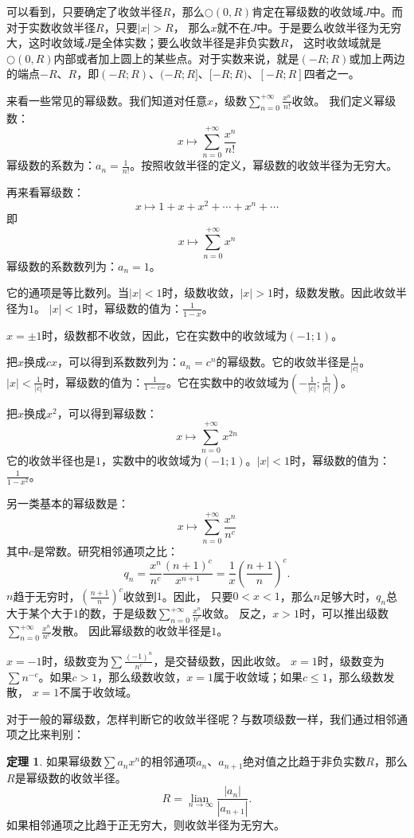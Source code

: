\documentclass[12pt,UTF8]{ctexbook}
\newcommand{\lian}[1]{
    \underset{#1}{\operatorname{lian}\,}
}
\newcommand{\qu}[2]{\displaystyle\left(#1;#2\right)}
\theoremstyle{definition}
\newtheorem{tm}{定理}[section]
\theoremstyle{plain}
\begin{document}
可以看到，只要确定了收敛半径$R$，那么$\bigcirc(0,R)$肯定在幂级数的收敛域$J$中。而对于实数收敛半径$R$，只要$|x|>R$，
那么$x$就不在$J$中。于是要么收敛半径为无穷大，这时收敛域$J$是全体实数；要么收敛半径是非负实数$R$，
这时收敛域就是$\bigcirc(0,R)$内部或者加上圆上的某些点。对于实数来说，就是$(-R;R)$或加上两边的端点$-R$、$R$，即$(-R;R)$、$(-R;R]$、$[-R;R)$、$[-R;R]$四者之一。

来看一些常见的幂级数。我们知道对任意$x$，级数$\sum_{n=0}^{+\infty} \frac{x^n}{n!}$收敛。
我们定义幂级数：
$$ x \mapsto \sum_{n=0}^{+\infty} \frac{x^n}{n!} $$
幂级数的系数为：$a_n = \frac{1}{n!}$。按照收敛半径的定义，幂级数的收敛半径为无穷大。

再来看幂级数：
$$ x \mapsto 1 + x + x^2 + \cdots + x^n + \cdots $$
即
$$ x \mapsto \sum_{n=0}^{+\infty} x^n $$
幂级数的系数数列为：$a_n = 1$。

它的通项是等比数列。当$|x|<1$时，级数收敛，$|x|>1$时，级数发散。因此收敛半径为$1$。
$|x|<1$时，幂级数的值为：$\frac{1}{1 - x}$。

$x = \pm 1$时，级数都不收敛，因此，它在实数中的收敛域为$(-1;1)$。

把$x$换成$cx$，可以得到系数数列为：$a_n = c^n$的幂级数。它的收敛半径是$\frac{1}{|c|}$。
$|x|<\frac{1}{|c|}$时，幂级数的值为：$\frac{1}{1 - cx}$。它在实数中的收敛域为$\qu{-\frac{1}{|c|}}{\frac{1}{|c|}}$。

把$x$换成$x^2$，可以得到幂级数：
$$ x \mapsto \sum_{n=0}^{+\infty} x^{2n} $$
它的收敛半径也是$1$，实数中的收敛域为$(-1;1)$。$|x|<1$时，幂级数的值为：$\frac{1}{1 - x^2}$。

另一类基本的幂级数是：
$$ x \mapsto \sum_{n=0}^{+\infty} \frac{x^n}{n^c}$$
其中$c$是常数。研究相邻通项之比：
$$ q_n = \frac{x^n}{n^c} \frac{(n+1)^c}{x^{n+1}} = \frac{1}{x} \left(\frac{n+1}{n}\right)^c. $$
$n$趋于无穷时，$\displaystyle \left(\frac{n+1}{n}\right)^c$收敛到$1$。因此，
只要$0<x<1$，那么$n$足够大时，$q_n$总大于某个大于$1$的数，于是级数$\sum_{n=0}^{+\infty} \frac{x^n}{n^c}$收敛。
反之，$x>1$时，可以推出级数$\sum_{n=0}^{+\infty} \frac{x^n}{n^c}$发散。
因此幂级数的收敛半径是$1$。

$x=-1$时，级数变为$\sum \frac{(-1)^n}{n^c}$，是交替级数，因此收敛。
$x=1$时，级数变为$\sum n^{-c}$。如果$c>1$，那么级数收敛，$x=1$属于收敛域；如果$c\leqslant 1$，那么级数发散，
$x=1$不属于收敛域。

对于一般的幂级数，怎样判断它的收敛半径呢？与数项级数一样，我们通过相邻通项之比来判别：

\begin{tm}
    如果幂级数$\sum a_n x^n$的相邻通项$a_n$、$a_{n+1}$绝对值之比趋于非负实数$R$，那么$R$是幂级数的收敛半径。
    $$ R = \lian{n\to\infty} \frac{|a_n|}{|a_{n+1}|}. $$
    如果相邻通项之比趋于正无穷大，则收敛半径为无穷大。
\end{tm}
\end{document}
